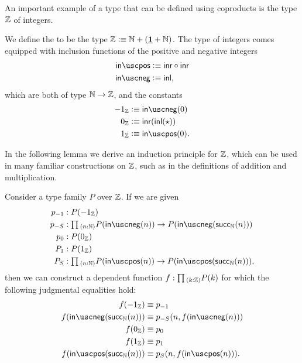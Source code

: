 An important example of a type that can be defined using coproducts is the type ${\mathbb{Z}}$ of integers.

\begin{defn}
  We define the  to be the type ${\mathbb{Z}}\vcentcolon\equiv{\mathbb{N}}+(\underline{\mathbf{1}}+{\mathbb{N}})$. The type of integers comes equipped with inclusion functions of the positive and negative integers
  \begin{align*}
    \inpos & \defeq \inr\circ\inr \\
    \inneg & \defeq \inl,
  \end{align*}
  which are both of type ${\mathbb{N}}\to{\mathbb{Z}}$, and the constants
  \begin{align*}
    -1_\Z & \defeq \inneg(0)\\
    0_\Z & \defeq \inr(\inl(\ttt))\\
    1_\Z & \defeq \inpos(0).
  \end{align*}
\end{defn}

In the following lemma we derive an induction principle for ${\mathbb{Z}}$, which can be used in many familiar constructions on ${\mathbb{Z}}$, such as in the definitions of addition and multiplication.

\begin{lem}\label{lem:Z_ind}
  Consider a type family $P$ over ${\mathbb{Z}}$. If we are given
  \begin{align*}
    p_{-1} & :P(-1_\Z) \\
    p_{-S} & : \prd{n:\N}P(\inneg(n))\to P(\inneg(\succN(n)))\\
    p_{0} & : P(0_\Z) \\
    P_{1} & : P(1_\Z) \\
    P_{S} & : \prd{n:\N}P(\inpos(n))\to P(\inpos(\succN(n))),
  \end{align*}
  then we can construct a dependent function $f:\prd{k:\Z}P(k)$ for which the following judgmental equalities hold:
  \begin{align*}
    f(-1_\Z) & \jdeq p_{-1} \\
    f(\inneg(\mathsf{succ}_\N(n))) & \jdeq p_{-S}(n,f(\inneg(n))) \\
    f(0_\Z) & \jdeq p_{0} \\
    f(1_\Z) & \jdeq p_{1} \\
    f(\inpos(\mathsf{succ}_\N(n))) & \jdeq p_S(n,f(\inpos(n))).
  \end{align*}
\end{lem}

